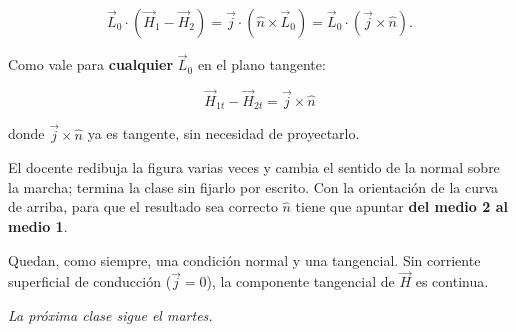 \documentclass[12pt,a4paper]{article}
\begin{document}
\[
\vec L_0\cdot(\vec H_1-\vec H_2) = \vec j\cdot(\hat n\times\vec L_0)
= \vec L_0\cdot(\vec j\times\hat n).
\]

Como vale para \textbf{cualquier} $\vec L_0$ en el plano tangente:

\begin{keybox}
\[
\boxed{\ \vec H_{1t} - \vec H_{2t} = \vec j\times\hat n\ }
\]
\end{keybox}
donde $\vec j\times\hat n$ ya es tangente, sin necesidad de proyectarlo.

\begin{notebox}
El docente redibuja la figura varias veces y
cambia el sentido de la normal sobre la marcha; termina la clase sin fijarlo
por escrito. Con la orientación de la curva de arriba, para que el resultado
sea correcto $\hat n$ tiene que apuntar \textbf{del medio 2 al medio 1}.
\end{notebox}

Quedan, como siempre, una condición normal y una tangencial. Sin corriente
superficial de conducción ($\vec j = 0$), la componente tangencial de $\vec H$
es continua.

\noindent\emph{La próxima clase sigue el martes.}
\end{document}
